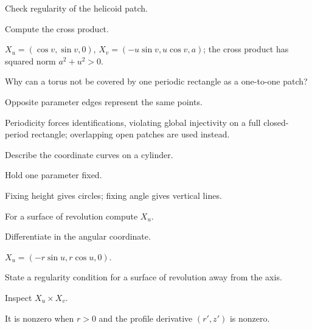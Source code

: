 \begin{exercise}\label{exr:vii14-16}
Check regularity of the helicoid patch.
\end{exercise}
\begin{hint}
Compute the cross product.
\end{hint}
\begin{solution}
\(X_u=(\cos v,\sin v,0)\), \(X_v=(-u\sin v,u\cos v,a)\); the cross product has squared norm \(a^2+u^2>0\).
\end{solution}

\begin{exercise}\label{exr:vii14-17}
Why can a torus not be covered by one periodic rectangle as a one-to-one patch?
\end{exercise}
\begin{hint}
Opposite parameter edges represent the same points.
\end{hint}
\begin{solution}
Periodicity forces identifications, violating global injectivity on a full closed-period rectangle; overlapping open patches are used instead.
\end{solution}

\begin{exercise}\label{exr:vii14-18}
Describe the coordinate curves on a cylinder.
\end{exercise}
\begin{hint}
Hold one parameter fixed.
\end{hint}
\begin{solution}
Fixing height gives circles; fixing angle gives vertical lines.
\end{solution}

\begin{exercise}\label{exr:vii14-19}
For a surface of revolution compute \(X_u\).
\end{exercise}
\begin{hint}
Differentiate in the angular coordinate.
\end{hint}
\begin{solution}
\(X_u=(-r\sin u,r\cos u,0)\).
\end{solution}

\begin{exercise}\label{exr:vii14-20}
State a regularity condition for a surface of revolution away from the axis.
\end{exercise}
\begin{hint}
Inspect \(X_u\times X_v\).
\end{hint}
\begin{solution}
It is nonzero when \(r>0\) and the profile derivative \((r',z')\) is nonzero.
\end{solution}

